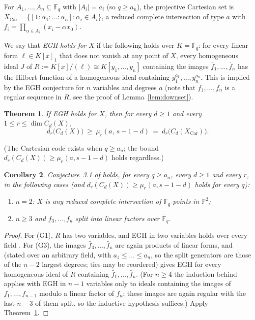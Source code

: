 \documentclass[11pt]{amsart}
\newtheorem{theorem}{Theorem}
\newtheorem{corollary}[theorem]{Corollary}
\theoremstyle{remark}
\theoremstyle{definition}
\newcommand{\F}{\mathbb F}
\newcommand{\Fb}{\overline{\mathbb F}_q}
\newcommand{\Car}{\mathrm{Car}}
\begin{document}
For $A_1,\dots,A_n\subseteq\F_q$ with $|A_i|=a_i$ (so $q\ge a_n$), the projective Cartesian set is
$X_\Car=\{[1:\alpha_1:\dots:\alpha_n]:\alpha_i\in A_i\}$, a reduced complete intersection of type $a$ with
$f_i=\prod_{\alpha\in A_i}(x_i-\alpha x_0)$.

We say that \emph{EGH holds for $X$} if the following holds over $K=\Fb$: for every linear form
$\ell\in K[x]_1$ that does not vanish at any point of $X$, every homogeneous ideal $J$ of
$R:=K[x]/(\ell)\cong K[y_1,\dots,y_n]$ containing the images $\bar f_1,\dots,\bar f_n$ has the Hilbert
function of a homogeneous ideal containing $y_1^{a_1},\dots,y_n^{a_n}$. This is implied by the EGH
conjecture \cite{EGH93,EGH96} for $n$ variables and degrees $a$ (note that $\bar f_1,\dots,\bar f_n$ is a
regular sequence in $R$, see the proof of Lemma~\ref{lem:downset}).

\begin{theorem}\label{thm:main}
If EGH holds for $X$, then for every $d\ge1$ and every $1\le r\le\dim C_d(X)$,
\[
 d_r\bigl(C_d(X)\bigr)\ \ge\ \mu_r(a,\,s-1-d)\ =\ d_r\bigl(C_d(X_\Car)\bigr).
\]
\end{theorem}

\noindent (The Cartesian code exists when $q\ge a_n$; the bound $d_r(C_d(X))\ge\mu_r(a,s-1-d)$ holds regardless.)

\begin{corollary}\label{cor:uncond}
Conjecture~3.1 of \cite{CMSS} holds, for every $q\ge a_n$, every $d\ge1$ and every $r$, in the following cases (and $d_r(C_d(X))\ge\mu_r(a,s-1-d)$ holds for every $q$):
\begin{enumerate}
\item[(G1)] $n=2$: $X$ is any reduced complete intersection of $\F_q$-points in $\mathbb P^2$;
\item[(G3)] $n\ge3$ and $f_3,\dots,f_n$ split into linear factors over $\Fb$.
\end{enumerate}
\end{corollary}

\begin{proof}
For (G1), $R$ has two variables, and EGH in two variables holds over every field
\cite{Richert,CavigliaMaclagan}. For (G3), the images $\bar f_3,\dots,\bar f_n$ are again products of linear
forms, and \cite[Cor.~4.4]{Abedelfatah} (stated over an arbitrary field, with $a_1\le\dots\le a_n$, so the
split generators are those of the $n-2$ largest degrees; ties may be reordered) gives EGH for every
homogeneous ideal of $R$ containing $\bar f_1,\dots,\bar f_n$. (For $n\ge4$ the induction behind
\cite[Cor.~4.4]{Abedelfatah} applies \cite[Thm.~4.2]{Abedelfatah} with EGH in $n-1$ variables only to
ideals containing the images of $f_1,\dots,f_{n-1}$ modulo a linear factor of $f_n$; these images are
again regular with the last $n-3$ of them split, so the inductive hypothesis suffices.) Apply
Theorem~\ref{thm:main}.
\end{proof}
\end{document}
